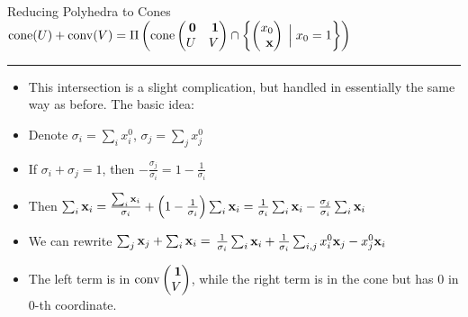 \documentclass{beamer}
\begin{document}
\begin{frame}{Reducing Polyhedra to Cones}
	$\VP{U}{V} = \Pi\left(\cone\pmb \0 & \1 \\ U & V \pme \cap \hpxz\right)$
	\hrule
	\begin{itemize}
		\item This intersection is a slight complication, but handled in essentially the same way as before.  The basic idea:
		      \pause
		\item Denote $\sigma_i = \sum_i x_i^0$, $\sigma_j = \sum_j x_j^0$
		      \pause
		\item If $\sigma_i + \sigma_j = 1$, then $-\frac{\sigma_j}{\sigma_i} = 1 - \frac{1}{\sigma_i}$
		      \pause
		\item Then $\sum_i \mathbf{x}_i = \frac{\sum_i \mathbf{x}_i}{\sigma_i} + \left(1-\frac{1}{\sigma_i}\right)\sum_i \mathbf{x}_i = \frac{1}{\sigma_i}\sum_i \mathbf{x}_i - \frac{\sigma_j}{\sigma_i}\sum_i \mathbf{x}_i$
		      \pause
		\item We can rewrite $\sum_j \mathbf{x}_j + \sum_i \mathbf{x}_i =$ $\frac{1}{\sigma_i}\sum_i \mathbf{x}_i + \frac{1}{\sigma_i}\sum_{i,j} x_i^0\mathbf{x}_j - x_j^0\mathbf{x}_i$
		      \pause
		\item The left term is in $\conv\pmb \1\\ V\pme$, while the right term is in the cone but has $0$ in $0$-th coordinate.
	\end{itemize}
\end{frame}
\end{document}

